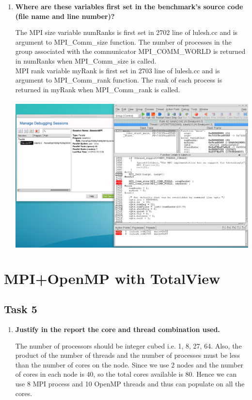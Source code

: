 \documentclass[10pt, letterpaper, twoside]{article}
\begin{document}
\begin{titlepage}
\begin{enumerate}
\item \textbf{Where are these variables first set in the benchmark’s source code (file name and line number)?}

The MPI size variable numRanks is first set in 2702 line of lulesh.cc and is argument to MPI\_Comm\_size function. The number of processes in the group associated with the communicator MPI\_COMM\_WORLD is returned in numRanks when MPI\_Comm\_size is called.\\ MPI rank variable myRank is first set in 2703 line of lulesh.cc and is argument to MPI\_Comm\_rank function. The rank of each process is returned in myRank when MPI\_Comm\_rank is called.\\ \\

\hspace{10mm}
\includegraphics[scale = 0.4]{Totalview3.png}
\vspace{5mm}

\end{enumerate}

\section{MPI+OpenMP with TotalView}

\subsection{Task 5}

\begin{enumerate}
\item \textbf{Justify in the report the core and thread combination used.}

The number of processors should be integer cubed i.e. 1, 8, 27, 64. Also, the product of the number of threads and the number of processes must be less than the number of cores on the node. Since we use 2 nodes and the number of cores in each node is 40, so the total cores available is 80. Hence we can use 8 MPI process and 10 OpenMP threads and thus can populate on all the cores. \\



\end{enumerate}
\end{titlepage}
\end{document}
